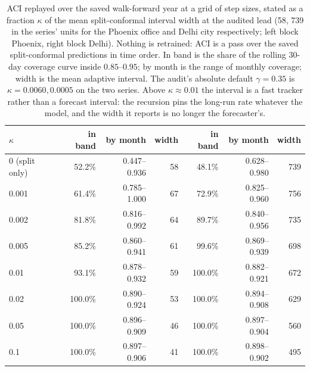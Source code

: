 \begin{table}[t]
\centering
\small
\begin{tabular}{lrrrrrr}
\toprule
$\kappa$ & in band & by month & width & in band & by month & width \\
\midrule
0 (split only) & 52.2\% & 0.447--0.936 & 58 & 48.1\% & 0.628--0.980 & 739 \\
0.001 & 61.4\% & 0.785--1.000 & 67 & 72.9\% & 0.825--0.960 & 756 \\
0.002 & 81.8\% & 0.816--0.992 & 64 & 89.7\% & 0.840--0.956 & 735 \\
0.005 & 85.2\% & 0.860--0.941 & 61 & 99.6\% & 0.869--0.939 & 698 \\
0.01 & 93.1\% & 0.878--0.932 & 59 & 100.0\% & 0.882--0.921 & 672 \\
0.02 & 100.0\% & 0.890--0.924 & 53 & 100.0\% & 0.894--0.908 & 629 \\
0.05 & 100.0\% & 0.896--0.909 & 46 & 100.0\% & 0.897--0.904 & 560 \\
0.1 & 100.0\% & 0.897--0.906 & 41 & 100.0\% & 0.898--0.902 & 495 \\
\bottomrule
\end{tabular}
\caption{ACI replayed over the saved walk-forward year at a grid of step sizes, stated as a fraction $\kappa$ of the mean split-conformal interval width at the audited lead (58, 739 in the series' units for the Phoenix office and Delhi city respectively; left block Phoenix, right block Delhi). Nothing is retrained: ACI is a pass over the saved split-conformal predictions in time order. In band is the share of the rolling 30-day coverage curve inside $0.85$--$0.95$; by month is the range of monthly coverage; width is the mean adaptive interval. The audit's absolute default $\gamma=0.35$ is $\kappa = 0.0060, 0.0005$ on the two series. Above $\kappa \approx 0.01$ the interval is a fast tracker rather than a forecast interval: the recursion pins the long-run rate whatever the model, and the width it reports is no longer the forecaster's.}
\label{tab:aci-gamma}
\end{table}
